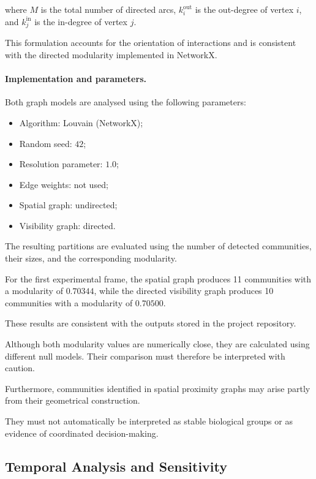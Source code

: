\documentclass[10pt,a4paper]{article}
\begin{document}
where $M$ is the total number of directed arcs,
$k_i^{\mathrm{out}}$ is the out-degree of vertex
$i$, and $k_j^{\mathrm{in}}$ is the in-degree
of vertex $j$.

This formulation accounts for the orientation
of interactions and is consistent with the
directed modularity implemented in NetworkX.

\paragraph{Implementation and parameters.}

Both graph models are analysed using the
following parameters:

\begin{itemize}
   \item Algorithm: Louvain (NetworkX);
   \item Random seed: $42$;
   \item Resolution parameter: $1.0$;
   \item Edge weights: not used;
   \item Spatial graph: undirected;
   \item Visibility graph: directed.
\end{itemize}

The resulting partitions are evaluated using
the number of detected communities, their sizes,
and the corresponding modularity.

For the first experimental frame, the spatial
graph produces 11 communities with a modularity
of $0.70344$, while the directed visibility
graph produces 10 communities with a modularity
of $0.70500$.

These results are consistent with the outputs
stored in the project repository.

Although both modularity values are numerically
close, they are calculated using different
null models. Their comparison must therefore
be interpreted with caution.

Furthermore, communities identified in spatial
proximity graphs may arise partly from their
geometrical construction.

They must not automatically be interpreted
as stable biological groups or as evidence
of coordinated decision-making.


\subsection{Temporal Analysis and Sensitivity}
\end{document}
